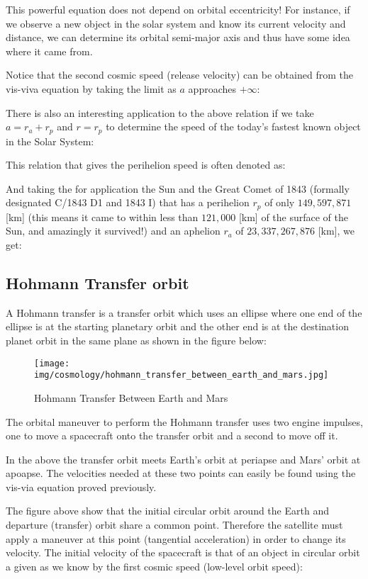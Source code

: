 	This powerful equation does not depend on orbital eccentricity! For instance, if we observe a new object in the solar system and know its current velocity and distance, we can determine its orbital semi-major axis and thus have some idea where it came from.	
		
	Notice that the second cosmic speed (release velocity) can be obtained from the vis-viva equation by taking the limit as $a$ approaches $+\infty$:
	
	There is also an interesting application to the above relation if we take $a=r_a+r_p$ and $r=r_p$ to determine the speed of the today's fastest known object in the Solar System:
	
	This relation that gives the perihelion speed is often denoted as:
	
	And taking the for application the Sun and the Great Comet of 1843 (formally designated C/1843 D1 and 1843 I) that has a perihelion $r_p$ of only $149,597,871$ [km] (this means it came to within less than $121,000$ [km] of the surface of the Sun, and amazingly it survived!) and an aphelion $r_a$ of $23,337,267,876$ [km], we get:
	
	
	\pagebreak
	\subsection{Hohmann Transfer orbit}
	 A Hohmann transfer is a transfer orbit which uses an ellipse where one end of the ellipse is at the starting planetary orbit and the other end is at the destination planet orbit in the same plane as shown in the figure below:
	\begin{figure}[H]
		\centering
		\texttt{[image: img/cosmology/hohmann\_transfer\_between\_earth\_and\_mars.jpg]}
		\caption{Hohmann Transfer Between Earth and Mars}
	\end{figure}
	The orbital maneuver to perform the Hohmann transfer uses two engine impulses, one to move a spacecraft onto the transfer orbit and a second to move off it.
	
	 In the above the transfer orbit meets Earth's orbit at periapse and Mars' orbit at apoapse. The velocities needed at these two points can easily be found using the vis-via equation proved previously.
	 
	The figure above show that the initial circular orbit around the Earth and departure (transfer) orbit share a common point. Therefore the satellite must apply a maneuver at this point (tangential acceleration) in order to change its velocity. The initial velocity of the spacecraft is that of an object in circular orbit a given as we know by the first cosmic speed (low-level orbit speed):
	
